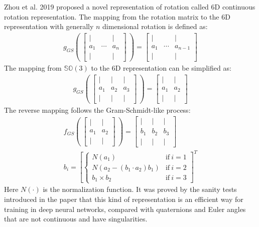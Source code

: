 \documentclass[12pt,DIV14,BCOR12mm,a4paper,footinclude=false,headinclude,parskip=half-,twoside,openright,cleardoublepage=empty,toc=index,bibliography=totoc,listof=totoc]{scrreprt}
\numberwithin{equation}{chapter}
\begin{document}
Zhou et al. 2019 \cite{Zhou_2019_CVPR} proposed a novel representation of rotation called 6D continuous rotation representation. The mapping from the rotation matrix to the 6D representation with generally $n$ dimensional rotation is defined as:
\begin{align}
  g_{GS}\left( \
    \begin{bmatrix}
      | & & | \\
      a_{1}  & \cdots & a_{n} \\
      | & & |
    \end{bmatrix} \
  \right) = 
  \begin{bmatrix}
    | & & | \\
    a_{1}  & \cdots & a_{n-1} \\
    | & & |
  \end{bmatrix}
\end{align}
The mapping from $\mathbb{S} \mathbb{O} (3)$ to the 6D representation can be simplified as:
\begin{align}\label{eq:ortho6d}
  g_{GS}\left( \
    \begin{bmatrix}
      | & | & | \\
      a_{1}  & a_{2} & a_{3} \\
      | & | & |
    \end{bmatrix} \
  \right) = 
  \begin{bmatrix}
    | & | \\
    a_{1} & a_{2} \\
    | & |
  \end{bmatrix}
\end{align}
The reverse mapping follows the Gram-Schmidt-like process:
\begin{gather}
  f_{GS}\left( \ 
    \begin{bmatrix}
      | & | \\
      a_{1}  & a_{2}  \\
      | & | 
    \end{bmatrix} \
  \right) = 
  \begin{bmatrix}
    | & | & |\\
    b_{1} & b_{2} & b_{3}\\
    | & | & |
  \end{bmatrix} \\
  b_{i} = \left[\left\{
    \begin{array}{lr}
    N(a_{1}) & \text{if} \ i=1\\
    N(a_{2}-(b_{1}\cdot a_{2})b_{1}) & \text{if} \ i=2\\
    b_{1}\times b_{2}& \text{if} \ i=3
    \end{array} 
  \right.
  \right] ^{T}
\end{gather}
Here $N(\cdot)$ is the normalization function. It was proved by the sanity tests introduced in the paper that this kind of representation is an efficient way for training in deep neural networks, compared with quaternions and Euler angles that are not continuous and have singularities.
\end{document}
